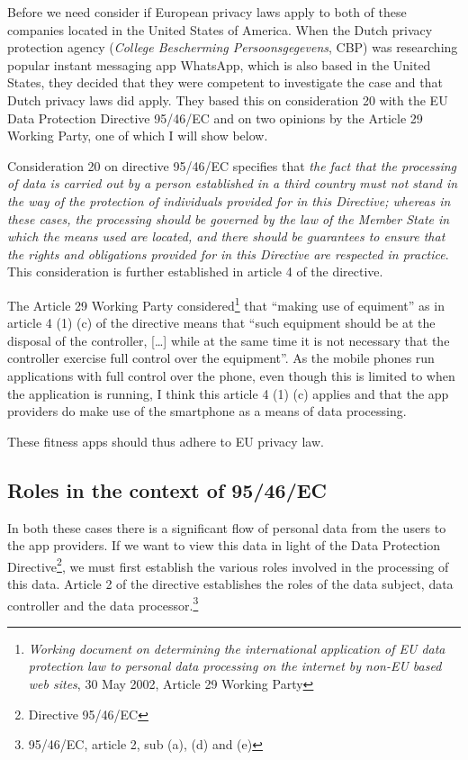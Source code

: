 \documentclass{article}
\begin{document}
Before we need consider if European privacy laws apply to both of these companies located in the United States of America.
When the Dutch privacy protection agency (\emph{College Bescherming Persoonsgegevens}, CBP) was researching popular instant messaging app WhatsApp, which is also based in the United States, they decided that they were competent to investigate the case and that Dutch privacy laws did apply.
They based this on consideration 20 with the EU Data Protection Directive 95/46/EC and on two opinions by the Article 29 Working Party, one of which I will show below.

Consideration 20 on directive 95/46/EC specifies that \emph{the fact that the processing of data is carried out by a person established in a third country must not stand in the way of the protection of individuals provided for in this Directive; whereas in these cases, the processing should be governed by the law of the Member State in which the means used are located, and there should be guarantees to ensure that the rights and obligations provided for in this Directive are respected in practice}.
This consideration is further established in article 4 of the directive.

The Article 29 Working Party considered\footnote{\emph{Working document on determining the international application of EU data protection law to personal data processing on the internet by non-EU based web sites}, 30 May 2002, Article 29 Working Party} that ``making use of equiment'' as in article 4 (1) (c) of the directive means that ``such equipment should be at the disposal of the controller, [\ldots] while at the same time it is not necessary that the controller exercise full control over the equipment''.
As the mobile phones run applications with full control over the phone, even though this is limited to when the application is running, I think this article 4 (1) (c) applies and that the app providers do make use of the smartphone as a means of data processing.

These fitness apps should thus adhere to EU privacy law.

\subsection{Roles in the context of 95/46/EC}

In both these cases there is a significant flow of personal data from the users to the app providers.
If we want to view this data in light of the Data Protection Directive\footnote{Directive 95/46/EC}, we must first establish the various roles involved in the processing of this data.
Article 2 of the directive establishes the roles of the data subject, data controller and the data processor.\footnote{95/46/EC, article 2, sub (a), (d) and (e)}
\end{document}
